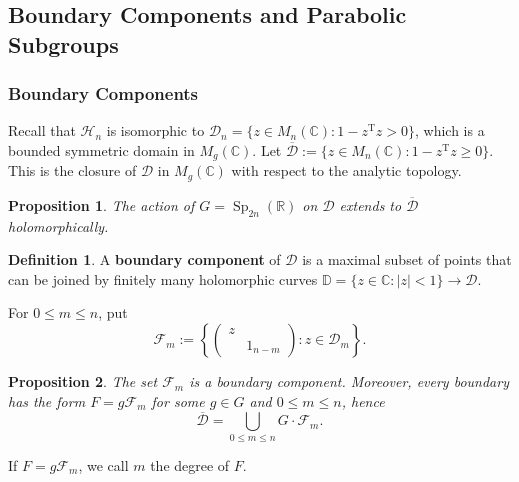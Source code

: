 \documentclass[11pt,english]{smfart}
\newtheorem{proposition}{Proposition}[section]
\theoremstyle{definition}
\newtheorem{definition}{Definition}
\theoremstyle{remark}
\newcommand{\R}{\mathbb{R}}
\renewcommand{\C}{\mathbb{C}}
\DeclareMathOperator{\Sp}{Sp}
\newcommand{\tran}[1]{{#1}^{\mathrm{T}}} %
\renewcommand{\bar}{\overline}
\begin{document}



\subsection{Boundary Components and Parabolic Subgroups}
\subsubsection{Boundary Components}
Recall that $\mathcal{H}_n$ is isomorphic to $\mathcal{D}_n = \{z\in M_n(\C): 1-\tran{z}z  > 0\}$, which is a bounded symmetric domain in $M_g(\C)$.
Let $\bar{\mathcal{D}} := \{z\in M_n(\C): 1-\tran{z}z  \ge 0\}$. This is the closure of $\mathcal{D}$ in $M_g(\C)$ with respect to the analytic topology.
\begin{proposition}
    The action of $G = \Sp_{2n}(\R)$ on $\mathcal{D}$ extends to $\bar{\mathcal{D}}$ holomorphically.
\end{proposition}

\begin{definition}
    A \textbf{boundary component} of $\mathcal{D}$ is a maximal subset of points that can be joined by finitely many holomorphic curves $\mathbb{D} = \{z\in\C: |z| < 1\}\to \mathcal{D}$.
\end{definition}

For $0\le m\le n$, put \[\mathcal{F}_m := \left\{ \begin{pmatrix}
    z & \\ & 1_{n-m}
\end{pmatrix}: z\in\mathcal{D}_{m} \right\}.\]
\begin{proposition}
   The set $\mathcal{F}_m$ is a boundary component. Moreover, every boundary has the form $F = g\mathcal{F}_m$ for some $g\in G$ and $0\le m\le n$, hence \[\bar{\mathcal{D}} = \bigcup_{0 \le m \le n} G\cdot\mathcal{F}_m.\]
\end{proposition}
If $F = g\mathcal{F}_m$, we call $m$ the degree of $F$.
\end{document}
